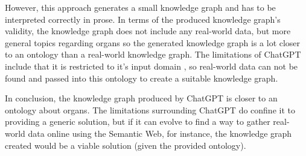However, this approach generates a small knowledge graph and has to be interpreted correctly in prose. In terms of the produced knowledge graph's validity, the knowledge graph does not include any real-world data, but more general topics regarding organs so the generated knowledge graph is a lot closer to an ontology than a real-world knowledge graph. The limitations of ChatGPT include that it is restricted to it's input domain \cite{chatgptwebsite}, so real-world data can not be found and passed into this ontology to create a suitable knowledge graph. 

In conclusion, the knowledge graph produced by ChatGPT is closer to an ontology about organs. The limitations surrounding ChatGPT do confine it to providing a generic solution, but if it can evolve to find a way to gather real-world data online using the Semantic Web, for instance, the knowledge graph created would be a viable solution (given the provided ontology).